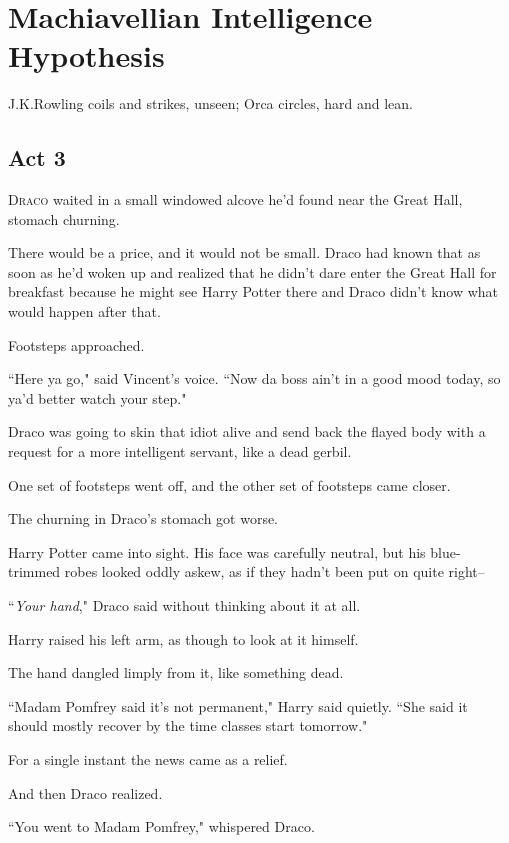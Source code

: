 \chapter{Machiavellian Intelligence Hypothesis}

\begin{chapterOpeningAuthorNote}
J.\?K.\?Rowling coils and strikes, unseen; Orca circles, hard and lean.
\end{chapterOpeningAuthorNote}

\section{Act 3}

\lettrine{D}{raco} waited in a small windowed alcove he'd found near the Great Hall, stomach churning.

There would be a price, and it would not be small. Draco had known that as soon as he'd woken up and realized that he didn't dare enter the Great Hall for breakfast because he might see Harry Potter there and Draco didn't know what would happen after that.

Footsteps approached.

``Here ya go," said Vincent's voice. ``Now da boss ain't in a good mood today, so ya'd better watch your step."

Draco was going to skin that idiot alive and send back the flayed body with a request for a more intelligent servant, like a dead gerbil.

One set of footsteps went off, and the other set of footsteps came closer.

The churning in Draco's stomach got worse.

Harry Potter came into sight. His face was carefully neutral, but his blue-trimmed robes looked oddly askew, as if they hadn't been put on quite right\---

``\emph{Your hand}," Draco said without thinking about it at all.

Harry raised his left arm, as though to look at it himself.

The hand dangled limply from it, like something dead.

``Madam Pomfrey said it's not permanent," Harry said quietly. ``She said it should mostly recover by the time classes start tomorrow."

For a single instant the news came as a relief.

And then Draco realized.

``You went to Madam Pomfrey," whispered Draco.

